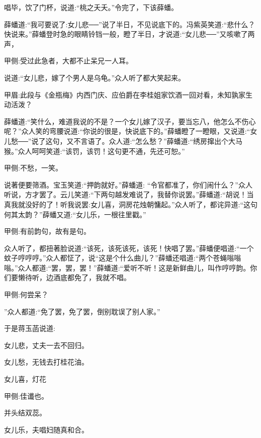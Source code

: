 \begin{parag}
    唱毕，饮了门杯，说道:“桃之夭夭。”令完了，下该薛蟠。
\end{parag}


\begin{parag}
    薛蟠道:“我可要说了:女儿悲──”说了半日，不见说底下的。冯紫英笑道:“悲什么？快说来。”薛蟠登时急的眼睛铃铛一般，瞪了半日，才说道:“女儿悲──”又咳嗽了两声，\begin{note}甲侧:受过此急者，大都不止呆兄一人耳。\end{note}说道:“女儿悲，嫁了个男人是乌龟。”众人听了都大笑起来。\begin{note}甲眉:此段与《金瓶梅》内西门庆、应伯爵在李桂姐家饮酒一回对看，未知孰家生动活泼？\end{note}薛蟠道:“笑什么，难道我说的不是？一个女儿嫁了汉子，要当忘八，他怎么不伤心呢？”众人笑的弯腰说道:“你说的很是，快说底下的。”薛蟠瞪了一瞪眼，又说道:“女儿愁──”说了这句，又不言语了。众人道:“怎么愁？”薛蟠道:“绣房撺出个大马猴。”众人呵呵笑道:“该罚，该罚！这句更不通，先还可恕。”\begin{note}甲侧:不愁，一笑。\end{note}说著便要筛酒。宝玉笑道:“押韵就好。”薛蟠道: “令官都准了，你们闹什么？”众人听说，方才罢了。云儿笑道:“下两句越发难说了，我替你说罢。”薛蟠道:“胡说！当真我就没好的了！听我说罢:女儿喜，洞房花烛朝慵起。”众人听了，都诧异道:“这句何其太韵？”薛蟠又道:“女儿乐，一根往里戳。”\begin{note}甲侧:有前韵句，故有是句。\end{note}众人听了，都扭著脸说道:“该死，该死该死，该死！快唱了罢。”薛蟠便唱道:“一个蚊子哼哼哼。”众人都怔了，说“这是个什么曲儿？”薛蟠还唱道:“两个苍蝇嗡嗡嗡。”众人都道:“罢，罢，罢！”薛蟠道:“爱听不听！这是新鲜曲儿，叫作哼哼韵。你们要懒待听，边酒底都免了，我就不唱。\begin{note}甲侧:何尝呆？\end{note}”众人都道:“免了罢，免了罢，倒别耽误了别人家。”
\end{parag}


\begin{parag}
    于是蒋玉菡说道:
\end{parag}


\begin{poem}
    \begin{pl}女儿悲，丈夫一去不回归。\end{pl}

    \begin{pl}女儿愁，无钱去打桂花油。\end{pl}

    \begin{pl}女儿喜，灯花\end{pl}\begin{note}甲侧:佳谶也。\end{note}\begin{pl}并头结双蕊。\end{pl}

    \begin{pl}女儿乐，夫唱妇随真和合。\end{pl}

\end{poem}


